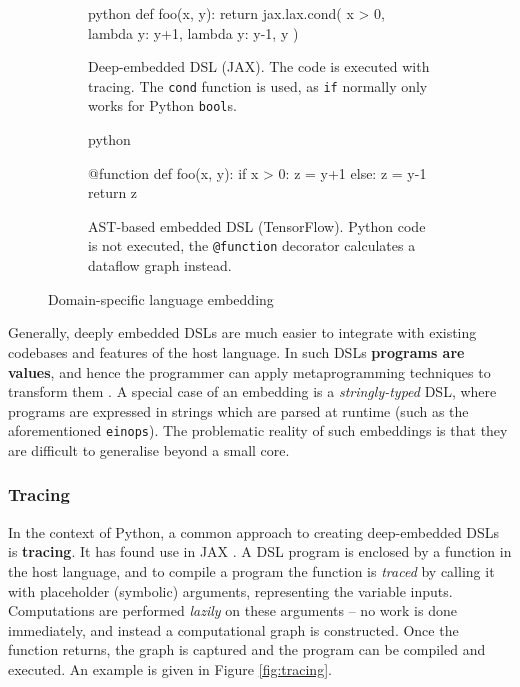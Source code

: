 \begin{figure}
\centering
\begin{subfigure}{.4\textwidth}
  \centering
  \begin{cminted}{python}
def foo(x, y):
  return jax.lax.cond(
    x > 0, 
    lambda y: y+1, 
    lambda y: y-1, 
    y
  )
  \end{cminted}
  \caption{Deep-embedded DSL (JAX). The code is executed with tracing. The \texttt{cond} function is used, as \texttt{if} normally only works for Python \texttt{bool}s.}
\end{subfigure} \quad %
\begin{subfigure}{.4\textwidth}
  \centering
    \begin{cminted}{python}

@function
def foo(x, y):
  if x > 0: z = y+1
  else:     z = y-1
  return z

    \end{cminted}
      \caption{AST-based embedded DSL (TensorFlow). Python code is not executed, the \texttt{@function} decorator calculates a dataflow graph instead.}
\end{subfigure}
\caption{Domain-specific language embedding}
\label{fig:embeddings}
\end{figure}

Generally, deeply embedded DSLs are much easier to integrate with existing codebases and features of the host language.
In such DSLs \textbf{programs are values}, and hence the programmer can apply metaprogramming techniques to transform them \cite{atkey2009unembedding}. 
A special case of an embedding is a \textit{stringly-typed} DSL, where programs are expressed in strings which are parsed at runtime (such as the aforementioned \texttt{einops}). The problematic reality of such embeddings is that they are difficult to generalise beyond a small core.

\subsubsection{Tracing} \label{tracing}

In the context of Python, a common approach to creating deep-embedded DSLs is \textbf{tracing}. It has found use in JAX \cite{frostig2018compiling}. A DSL program is enclosed by a function in the host language, and to compile a program the function is \textit{traced} by calling it with placeholder (symbolic) arguments, representing the variable inputs. Computations are performed \textit{lazily} on these arguments -- no work is done immediately, and instead a computational graph is constructed. Once the function returns, the graph is captured and the program can be compiled and executed. An example is given in Figure \ref{fig:tracing}.


